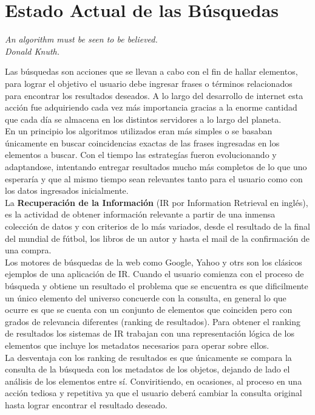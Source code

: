 \section{Estado Actual de las Búsquedas}
{\begin{small}%
\begin{flushright}%
\it An algorithm must be seen to be believed.\\Donald Knuth.
\end{flushright}%
\end{small}%
\vspace{.5cm}}
Las búsquedas son acciones que se llevan a cabo con el fin de hallar elementos, para lograr el objetivo el usuario debe ingresar frases o términos relacionados para encontrar los resultados deseados. A lo largo del desarrollo de internet esta acción fue adquiriendo cada vez más importancia gracias a la enorme cantidad que cada día se almacena en los distintos servidores a lo largo del planeta.\\
En un principio los algoritmos utilizados eran más simples o se basaban únicamente en buscar coincidencias exactas de las frases ingresadas en los elementos a buscar. Con el tiempo las estrategías fueron evolucionando y adaptandose, intentando entregar resultados mucho más completos de lo que uno esperaría y que al mismo tiempo sean relevantes tanto para el usuario como con los datos ingresados inicialmente.\\
La \textbf{Recuperación de la Información} (IR por Information Retrieval en inglés), es la actividad de obtener información relevante a partir de una inmensa colección de datos y con criterios de lo más variados, desde el resultado de la final del mundial de fútbol, los libros de un autor y hasta el mail de la confirmación de una compra.\\
Los motores de búsquedas de la web como Google, Yahoo y otrs son los clásicos ejemplos de una aplicación de IR. Cuando el usuario comienza con el proceso de búsqueda y obtiene un resultado el problema que se encuentra es que dificilmente un único elemento del universo concuerde con la consulta, en general lo que ocurre es que se cuenta con un conjunto de elementos que coinciden pero con grados de relevancia diferentes (ranking de resultados). Para obtener el ranking de resultados los sistemas de IR trabajan con una representación lógica de los elementos que incluye los metadatos necesarios para operar sobre ellos.\\
La desventaja con los ranking de resultados es que únicamente se compara la consulta de la búsqueda con los metadatos de los objetos, dejando de lado el análisis de los elementos entre sí. Conviritiendo, en ocasiones, al proceso en una acción tediosa y repetitiva ya que el usuario deberá cambiar la consulta original hasta lograr encontrar el resultado deseado.\\
